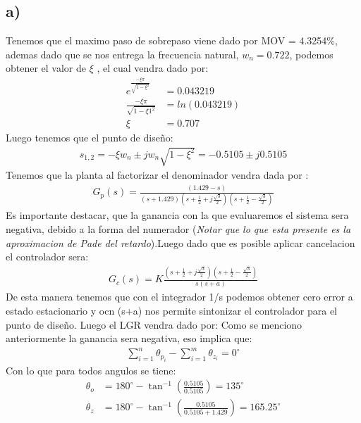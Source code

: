 \documentclass[
  11pt,
  letterpaper,
   addpoints,
   answers
  ]{exam}
\begin{document}
\begin{questions}
\begin{solution}
    \subsection*{a)}
    Tenemos que el maximo paso de sobrepaso viene dado por MOV = 4.3254\%, ademas dado que se nos entrega la frecuencia natural, $w_n = 0.722$, podemos obtener el valor de $\xi$ , el cual vendra dado por:
    \begin{align}
        e^{\frac{-\xi \pi}{\sqrt{1-\xi^{2}}}} &= 0.043219\\
        \frac{-\xi \pi}{\sqrt{1-\xi1^{2}}} &= ln(0.043219)\\
        \xi &= 0.707
    \end{align}
    Luego tenemos que el punto de diseño:
    \begin{align}
        s_{1,2} = -\xi w_n \pm jw_n\sqrt{1-\xi^{2}} = -0.5105 \pm j0.5105
    \end{align}
    Tenemos que  la planta al factorizar el denominador vendra dada por :
    \begin{align}
        G_{p}(s) = \frac{(1.429 - s)}{(s+1.429)\left(s + \frac{1}{2} + j\frac{\sqrt{3}}{2}\right)\left(s+ \frac{1}{2} - \frac{\sqrt{3}}{2}\right)}
    \end{align}
    Es importante destacar, que la ganancia con la que evaluaremos el sistema sera negativa, debido a la forma del numerador (\textit{Notar que lo que esta presente es la aproximacion de Pade del retardo}).Luego dado que es posible aplicar cancelacion el controlador sera:
    \begin{align}
        G_{c}(s) = K \frac{\left(s + \frac{1}{2} + j\frac{\sqrt{3}}{2}\right)\left(s+ \frac{1}{2} - \frac{\sqrt{3}}{2}\right)}{s(s+a)}
    \end{align}
    De esta manera tenemos que con el integrador 1/s podemos obtener cero error a estado estacionario y ocn (s+a) nos permite sintonizar el controlador para el punto de diseño. Luego el LGR vendra dado por:
    Como se menciono anteriormente la ganancia sera negativa, eso implica que:
    \begin{align}
        \sum_{i=1}^{n} \theta_{p_{i}} - \sum_{i=1}^{m} \theta_{z_{i}} = 0^{\circ} 
    \end{align}
    Con lo que para todos angulos se tiene:
    \begin{align}
        \theta_o &= 180^{\circ} - \tan^{-1}\left(\frac{0.5105}{0.5105}\right) = 135^{\circ} \\
        \theta_z &= 180^{\circ} - \tan^{-1}\left(\frac{0.5105}{0.5105 + 1.429}\right) = 165.25^{\circ} \\

\end{align}
\end{solution}
\end{questions}
\end{document}
